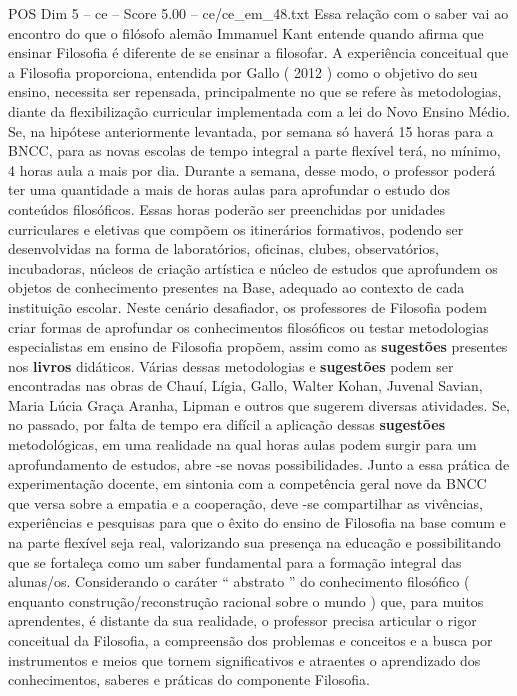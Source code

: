 \begin{textsample}{POS Dim 5 – ce – Score 5.00 – ce/ce\_em\_48.txt}
Essa relação com o saber vai ao encontro do que o filósofo alemão Immanuel Kant entende quando afirma que ensinar Filosofia é diferente de se ensinar a filosofar.
A experiência conceitual que a Filosofia proporciona, entendida por Gallo ( 2012 ) como o objetivo do seu ensino, necessita ser repensada, principalmente no que se refere às metodologias, diante da flexibilização curricular implementada com a lei do Novo Ensino Médio.
Se, na hipótese anteriormente levantada, por semana só haverá 15 horas para a BNCC, para as novas escolas de tempo integral a parte flexível terá, no mínimo, 4 horas aula a mais por dia.
Durante a semana, desse modo, o professor poderá ter uma quantidade a mais de horas aulas para aprofundar o estudo dos conteúdos filosóficos.
Essas horas poderão ser preenchidas por unidades curriculares e eletivas que compõem os itinerários formativos, podendo ser desenvolvidas na forma de laboratórios, oficinas, clubes, observatórios, incubadoras, núcleos de criação artística e núcleo de estudos que aprofundem os objetos de conhecimento presentes na Base, adequado ao contexto de cada instituição escolar.
Neste cenário desafiador, os professores de Filosofia podem criar formas de aprofundar os conhecimentos filosóficos ou testar metodologias especialistas em ensino de Filosofia propõem, assim como as \textbf{sugestões} presentes nos \textbf{livros} didáticos.
Várias dessas metodologias e \textbf{sugestões} podem ser encontradas nas obras de Chauí, Lígia, Gallo, Walter Kohan, Juvenal Savian, Maria Lúcia Graça Aranha, Lipman e outros que sugerem diversas atividades.
Se, no passado, por falta de tempo era difícil a aplicação dessas \textbf{sugestões} metodológicas, em uma realidade na qual horas aulas podem surgir para um aprofundamento de estudos, abre -se novas possibilidades.
Junto a essa prática de experimentação docente, em sintonia com a competência geral nove da BNCC que versa sobre a empatia e a cooperação, deve -se compartilhar as vivências, experiências e pesquisas para que o êxito do ensino de Filosofia na base comum e na parte flexível seja real, valorizando sua presença na educação e possibilitando que se fortaleça como um saber fundamental para a formação integral das alunas/os.
Considerando o caráter “ abstrato ” do conhecimento filosófico ( enquanto construção/reconstrução racional sobre o mundo ) que, para muitos aprendentes, é distante da sua realidade, o professor precisa articular o rigor conceitual da Filosofia, a compreensão dos problemas e conceitos e a busca por instrumentos e meios que tornem significativos e atraentes o aprendizado dos conhecimentos, saberes e práticas do componente Filosofia.

\end{textsample}
